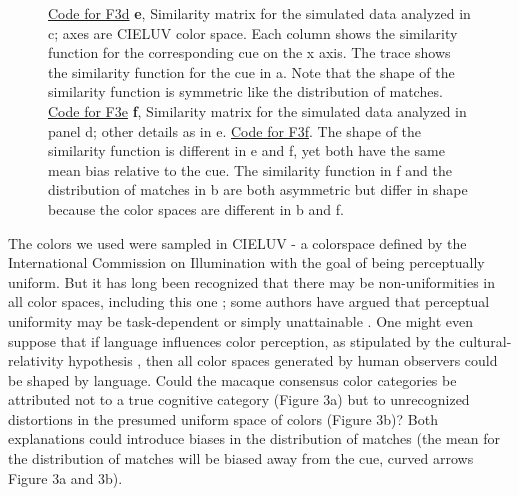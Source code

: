 \documentclass[9pt,biorxiv,lineno,onehalfspacing]{lapreprint}
\begin{document}
\begin{refsection}
\begin{figure}
\begin{fullwidth}
{    \href{https://github.com/NEI-LSR/MacaqueColorCategories/blob/main/Outputs/Paper/Figures/working/F3_TCCModel/Code/F3bdf_TCCModel_StimulusSpaceNonUnifomity.m}{Code for F3d}
    \textbf{e}, Similarity matrix for the simulated data analyzed in c; axes are CIELUV color space. 
    Each column shows the similarity function for the corresponding cue on the x axis. 
    The trace shows the similarity function for the cue in a. 
    Note that the shape of the similarity function is symmetric like the distribution of matches. \href{https://github.com/NEI-LSR/MacaqueColorCategories/blob/main/Outputs/Paper/Figures/working/F3_TCCModel/Code/F3ace_TCCModel_OffsetGaussian.m}{Code for F3e} \textbf{f}, Similarity matrix for the simulated data analyzed in panel d; other details as in e. 
    \href{https://github.com/NEI-LSR/MacaqueColorCategories/blob/main/Outputs/Paper/Figures/working/F3_TCCModel/Code/F3bdf_TCCModel_StimulusSpaceNonUnifomity.m}{Code for F3f}. The shape of the similarity function is different in e and f, yet both have the same mean bias relative to the cue. 
    The similarity function in f and the distribution of matches in b are both asymmetric but differ in shape because the color spaces are different in b and f.}
    \label{fig:TCCDemo}
    \end{fullwidth}
\end{figure}

The colors we used were sampled in CIELUV - a colorspace defined by the International Commission on Illumination with the goal of being perceptually uniform. 
But it has long been recognized that there may be non-uniformities in all color spaces, including this one \citep{stockman_colorimetry_2010}; some authors have argued that perceptual uniformity may be task-dependent or simply unattainable \citep{judd_ideal_1970,bujack_non-riemannian_2022}. 
One might even suppose that if language influences color perception, as stipulated by the cultural-relativity hypothesis \citep{roberson_color_2005}, then all color spaces generated by human observers could be shaped by language. 
Could the macaque consensus color categories be attributed not to a true cognitive category (Figure 3a) but to unrecognized distortions in the presumed uniform space of colors (Figure 3b)? 
Both explanations could introduce biases in the distribution of matches (the mean for the distribution of matches will be biased away from the cue, curved arrows Figure 3a and 3b).


\end{refsection}
\end{document}
